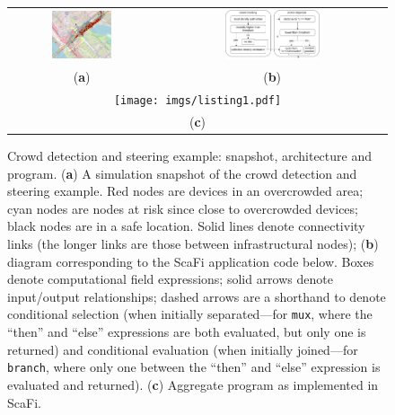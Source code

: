 \documentclass[jsan,article,accept,moreauthors,pdftex]{Definitions/mdpi}
\begin{document}
\begin{figure}[H]
\widefigure
\begin{tabular}{cc}

\includegraphics[width=0.43\textwidth]{imgs/crowd-example.png}
&
\includegraphics[width=0.43\textwidth]{imgs/crowd-detection-steering-diagram.pdf}\\

({\bf a})&({\bf b})\\


\multicolumn{2}{c}{\texttt{[image: imgs/listing1.pdf]}}\\



\multicolumn{2}{c}{({\bf c})}\\

\end{tabular}

\caption{Crowd detection and steering example: snapshot, architecture and program. (\textbf{a}) A simulation snapshot of the crowd detection and steering example. Red nodes are devices in an overcrowded area;
 cyan nodes are nodes at risk since close to overcrowded devices;
 black nodes are in a safe location. Solid lines denote connectivity links (the longer links are those between infrastructural nodes); (\textbf{b}) diagram corresponding to the ScaFi application code below. Boxes denote computational field expressions; solid arrows denote input/output relationships;
dashed arrows are a shorthand to denote conditional selection (when initially separated---for \lstinline|mux|, where the ``then'' and ``else'' expressions are both evaluated, but only one is returned) and conditional evaluation (when initially joined---for \lstinline|branch|, where only one between the ``then'' and  ``else'' expression is evaluated and returned). (\textbf{c}) Aggregate program as implemented in ScaFi.}
\label{fig:crowd-example}
\end{figure}
\end{document}
